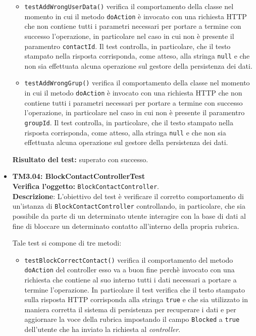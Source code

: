 \begin{itemize}
\begin{itemize}
\item \texttt{testAddWrongUserData()} verifica il comportamento della classe nel momento in cui il metodo \texttt{doAction} è invocato con una richiesta HTTP che non contiene tutti i parametri necessari per portare a termine con successo l'operazione, in particolare nel caso in cui non è presente il paramentro \texttt{contactId}. Il test controlla, in particolare, che il testo stampato nella risposta corrisponda, come atteso, alla stringa \texttt{null} e che non sia effettuata alcuna operazione sul gestore della persistenza dei dati.

\item \texttt{testAddWrongGrup()} verifica il comportamento della classe nel momento in cui il metodo \texttt{doAction} è invocato con una richiesta HTTP che non contiene tutti i parametri necessari per portare a termine con successo l'operazione, in particolare nel caso in cui non è presente il paramentro \texttt{groupId}. Il test controlla, in particolare, che il testo stampato nella risposta corrisponda, come atteso, alla stringa \texttt{null} e che non sia effettuata alcuna operazione sul gestore della persistenza dei dati.

\end{itemize}
\textbf{Risultato del test:} superato con successo.


\item \textbf{TM3.04: BlockContactControllerTest}\\
\textbf{Verifica l'oggetto:} \texttt{BlockContactController}.\\
\textbf{Descrizione}: L'obiettivo del test è verificare il corretto comportamento di un'istanza di \texttt{BlockContactController} controllando, in particolare, che sia possibile da parte di un determinato utente interagire con la base di dati al fine di bloccare un determinato contatto all'interno della propria rubrica.

Tale test si compone di tre metodi: 

\begin{itemize}
\item \texttt{testBlockCorrectContact()} verifica il comportamento del metodo \texttt{doAction} del controller esso va a buon fine perchè invocato con una richiesta che contiene al suo interno tutti i dati necessari a portare a termine l'operazione. In particolare il test verifica che il testo stampato sulla risposta HTTP corrisponda alla stringa \texttt{true} e che sia utilizzato in maniera corretta il sistema di persistenza per recuperare i dati e per aggiornare la voce della rubrica impostando il campo \texttt{Blocked} a \texttt{true} dell'utente che ha inviato la richiesta al \textit{controller}.


\end{itemize}
\end{itemize}
